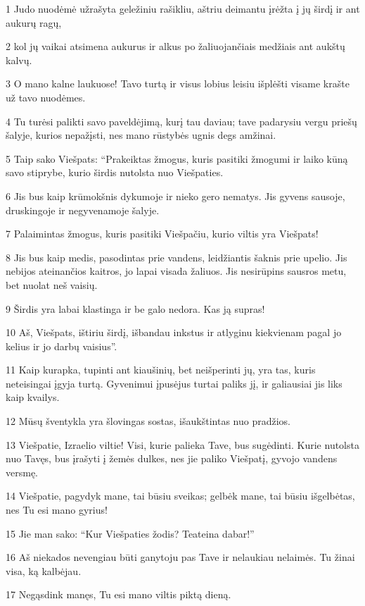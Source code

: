 \par 1 Judo nuodėmė užrašyta geležiniu rašikliu, aštriu deimantu įrėžta į jų širdį ir ant aukurų ragų, 
\par 2 kol jų vaikai atsimena aukurus ir alkus po žaliuojančiais medžiais ant aukštų kalvų. 
\par 3 O mano kalne laukuose! Tavo turtą ir visus lobius leisiu išplėšti visame krašte už tavo nuodėmes. 
\par 4 Tu turėsi palikti savo paveldėjimą, kurį tau daviau; tave padarysiu vergu priešų šalyje, kurios nepažįsti, nes mano rūstybės ugnis degs amžinai. 
\par 5 Taip sako Viešpats: “Prakeiktas žmogus, kuris pasitiki žmogumi ir laiko kūną savo stiprybe, kurio širdis nutolsta nuo Viešpaties. 
\par 6 Jis bus kaip krūmokšnis dykumoje ir nieko gero nematys. Jis gyvens sausoje, druskingoje ir negyvenamoje šalyje. 
\par 7 Palaimintas žmogus, kuris pasitiki Viešpačiu, kurio viltis yra Viešpats! 
\par 8 Jis bus kaip medis, pasodintas prie vandens, leidžiantis šaknis prie upelio. Jis nebijos ateinančios kaitros, jo lapai visada žaliuos. Jis nesirūpins sausros metu, bet nuolat neš vaisių. 
\par 9 Širdis yra labai klastinga ir be galo nedora. Kas ją supras! 
\par 10 Aš, Viešpats, ištiriu širdį, išbandau inkstus ir atlyginu kiekvienam pagal jo kelius ir jo darbų vaisius”. 
\par 11 Kaip kurapka, tupinti ant kiaušinių, bet neišperinti jų, yra tas, kuris neteisingai įgyja turtą. Gyvenimui įpusėjus turtai paliks jį, ir galiausiai jis liks kaip kvailys. 
\par 12 Mūsų šventykla yra šlovingas sostas, išaukštintas nuo pradžios. 
\par 13 Viešpatie, Izraelio viltie! Visi, kurie palieka Tave, bus sugėdinti. Kurie nutolsta nuo Tavęs, bus įrašyti į žemės dulkes, nes jie paliko Viešpatį, gyvojo vandens versmę. 
\par 14 Viešpatie, pagydyk mane, tai būsiu sveikas; gelbėk mane, tai būsiu išgelbėtas, nes Tu esi mano gyrius! 
\par 15 Jie man sako: “Kur Viešpaties žodis? Teateina dabar!” 
\par 16 Aš niekados nevengiau būti ganytoju pas Tave ir nelaukiau nelaimės. Tu žinai visa, ką kalbėjau. 
\par 17 Negąsdink manęs, Tu esi mano viltis piktą dieną. 
